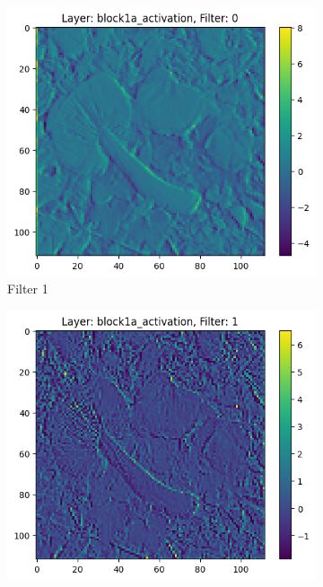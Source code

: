 \begin{figure}[h]
    \centering
    \begin{subfigure}[b]{0.3\textwidth}
        \centering
        \includegraphics[width=\textwidth]{images/filter 0block1a_activation.png}
        \caption{Filter 1}
        \label{fig:filter1}
    \end{subfigure}
    \begin{subfigure}[b]{0.3\textwidth}
        \centering
        \includegraphics[width=\textwidth]{images/filter 1block1a_activation.png}

\end{subfigure}
\end{figure}
